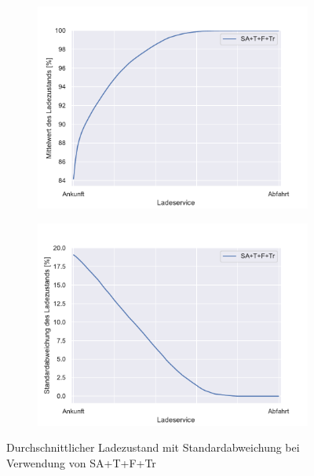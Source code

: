 \begin{figure}
	\begin{subfigure}{0.49\linewidth}
		\includegraphics[width=\linewidth]{img/SA_wt_trafo/SlottedAloha_waitingTime_VDE_tau_trafo_13_soc_mean.pdf}
        \label{ABB_SAwtTrafo_SocMEAN}
	\end{subfigure}
	\begin{subfigure}{0.49\linewidth}
		\includegraphics[width=\linewidth]{img/SA_wT_trafo/SlottedAloha_waitingTime_VDE_tau_trafo_13_soc_std.pdf}
        \label{ABB_SAwtTrafo_SocSTD}
	\end{subfigure}
	\caption{Durchschnittlicher Ladezustand mit Standardabweichung bei Verwendung von SA+T+F+Tr}
\end{figure}
